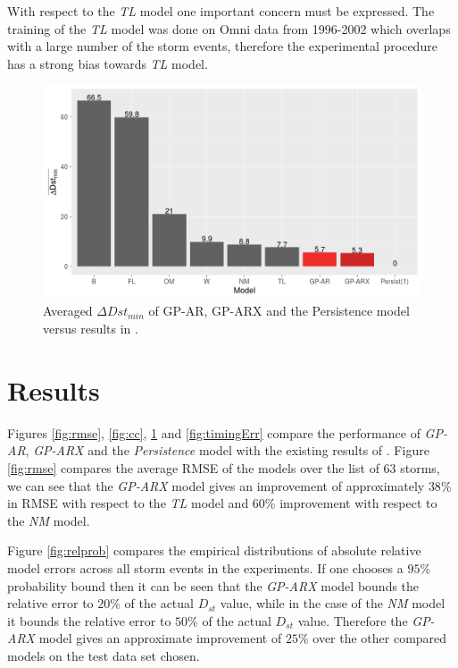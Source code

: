 \documentclass[referee,a4paper,12pt,traditabstract]{swsc}
\begin{document}
\begin{linenumbers}
With respect to the \emph{TL} model one important concern must be expressed. The training of the \emph{TL} model was done on Omni data from 1996-2002 which overlaps with a large number of the storm events, therefore the experimental procedure has a strong bias towards \emph{TL} model.


\begin{figure}
   \centering
   \includegraphics[width=\textwidth]{Compare_deltaDst.png}
      \caption{Averaged $\Delta Dst_{min}$ of GP-AR, GP-ARX and the Persistence model versus results in \citet{Ji2012}.}
         \label{fig:deltaDst}
   \end{figure}



\section{Results} \label{sec:res}

Figures \ref{fig:rmse}, \ref{fig:cc}, \ref{fig:deltaDst} and \ref{fig:timingErr} compare the performance of \emph{GP-AR}, \emph{GP-ARX} and the \emph{Persistence} model with the existing results of \citet{Ji2012}. Figure \ref{fig:rmse} compares the average RMSE of the models over the list of 63 storms, we can see that the \emph{GP-ARX} model gives an improvement of approximately $38\%$ in RMSE with respect to the \emph{TL} model and $60\%$ improvement with respect to the \emph{NM} model. 

Figure \ref{fig:relprob} compares the empirical distributions of absolute relative model errors across all storm events in the experiments. If one chooses a $95\%$ probability bound then it can be seen that the \emph{GP-ARX} model bounds the relative error to $20\%$ of the actual $D_{st}$ value, while in the case of the \emph{NM} model it bounds the relative error to $50\%$ of the actual $D_{st}$ value. Therefore the \emph{GP-ARX} model gives an approximate improvement of $25\%$ over the other compared models on the test data set chosen.



\end{linenumbers}
\end{document}
